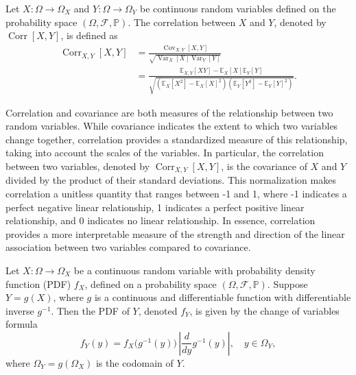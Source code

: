 \begin{definition}[Correlation]
	\label{def:correlation}
	Let $X: \Omega \to \Omega_X$ and $Y: \Omega \to \Omega_Y$ be continuous random variables defined on the probability space $(\Omega, \mathcal{F}, \mathbb{P})$. The correlation between $X$ and $Y$, denoted by $\operatorname{Corr}[X,Y]$, is defined as
	\begin{equation}
		\begin{split}
			\operatorname{Corr}_{X,Y}[X,Y] &= \frac{\operatorname{Cov}_{X,Y}[X,Y]}{\sqrt{\operatorname{Var}_X[X]  \operatorname{Var}_Y[Y]}} \\
			&= \frac{\mathbb{E}_{X,Y}[XY]-\mathbb{E}_X[X]\mathbb{E}_Y[Y]}{\sqrt{\left(\mathbb{E}_X[X^2] - \mathbb{E}_X[X]^2\right) \left(\mathbb{E}_Y[Y^2] - \mathbb{E}_Y[Y]^2\right)}}.
		\end{split}
	\end{equation}
\end{definition}

\begin{remark}
	Correlation and covariance are both measures of the relationship between two random variables. While covariance indicates the extent to which two variables change together, correlation provides a standardized measure of this relationship, taking into account the scales of the variables. In particular, the correlation between two variables, denoted by $\operatorname{Corr}_{X,Y}[X, Y]$, is the covariance of $X$ and $Y$ divided by the product of their standard deviations. This normalization makes correlation a unitless quantity that ranges between -1 and 1, where -1 indicates a perfect negative linear relationship, 1 indicates a perfect positive linear relationship, and 0 indicates no linear relationship. In essence, correlation provides a more interpretable measure of the strength and direction of the linear association between two variables compared to covariance.
\end{remark}

\begin{definition}
	\label{def:change_of_variables}
	Let $X: \Omega \to \Omega_X$ be a continuous random variable with probability density function (PDF) $f_X$, defined on a probability space $(\Omega, \mathcal{F}, \mathbb{P})$. Suppose $Y = g(X)$, where $g$ is a continuous and differentiable function with differentiable inverse $g^{-1}$. Then the PDF of $Y$, denoted $f_Y$, is given by the change of variables formula~\cite{Sivia2006}
	\begin{equation}
		f_Y(y) = f_X\bigl(g^{-1}(y)\bigr) \, \left| \frac{d}{dy} g^{-1}(y) \right|, \quad y \in \Omega_Y,
	\end{equation}
	where $\Omega_Y = g(\Omega_X)$ is the codomain of $Y$.
\end{definition}

